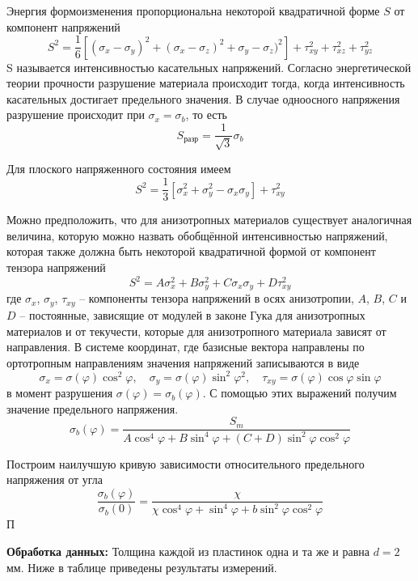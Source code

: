\documentclass[a4paper,12pt]{article}
\begin{document}
Энергия формоизменения пропорциональна некоторой квадратичной форме $S$ от компонент напряжений 
\[S^2 = \frac{1}{6} [(\sigma_x - \sigma_y)^2 + (\sigma_x - \sigma_z)^2 + \sigma_y - \sigma_z)^2] + \tau_{xy}^2 + \tau_{xz}^2 + \tau_{yz}^2\]
S называется интенсивностью касательных напряжений. Согласно энергетической теории прочности разрушение материала происходит тогда, когда интенсивность касательных достигает предельного значения. В случае одноосного напряжения разрушение происходит при $\sigma_x = \sigma_b$, то есть
\[S_{разр} = \frac{1}{\sqrt{3}} \sigma_b\]

Для плоского напряженного состояния имеем 
\[S^2 = \frac{1}{3} [\sigma_x^2 + \sigma_y^2 - \sigma_x \sigma_y] + \tau_{xy}^2\]

Можно предположить, что для анизотропных материалов существует аналогичная величина, которую можно назвать обобщённой интенсивностью напряжений, которая также должна быть некоторой квадратичной формой от компонент тензора напряжений
\[S^2 = A\sigma_x^2 + B\sigma_y^2 + C\sigma_x\sigma_y + D \tau_{xy}^2\]
где $\sigma_x$, $\sigma_y$, $\tau_{xy}$  -- компоненты тензора напряжений в осях анизотропии, $A$, $B$, $C$ и $D$ -- постоянные, зависящие от модулей в законе Гука для анизотропных материалов и от текучести, которые для анизотропного материала зависят от направления. В системе координат, где базисные вектора направлены по ортотропным направлениям значения напряжений записываются в виде 
\[\sigma_x = \sigma (\varphi) \cos^2{\varphi}, \quad \sigma_y = \sigma (\varphi) \sin^2{\varphi}^2, \quad \tau_{xy} = \sigma (\varphi) \cos{\varphi} \sin{\varphi}\]
в момент разрушения $\sigma (\varphi) = \sigma_b (\varphi)$. С помощью этих выражений получим значение предельного напряжения.
\[\sigma_b (\varphi) = \frac{S_m}{A\cos^4{\varphi} + B\sin^4{\varphi} + (C + D)\sin^2{\varphi}\cos^2{\varphi}}\]

Построим наилучшую кривую зависимости относительного предельного напряжения от угла
\[\frac{\sigma_b (\varphi)}{\sigma_b (0)} = \frac{\chi}{\chi \cos^4{\varphi} + \sin^4{\varphi} + b \sin^2{\varphi}\cos^2{\varphi}}\]
П

\textbf{Обработка данных:} 
Толщина каждой из пластинок  одна и та же и равна $d = 2$ мм. Ниже в таблице приведены результаты измерений.
\end{document}
